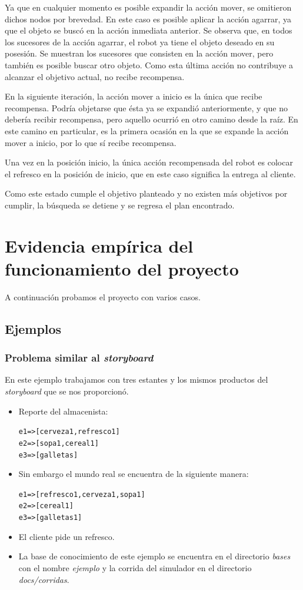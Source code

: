 \documentclass[11pt]{article}
\newcommand{\bt}{\begin{alltt}}
\newcommand{\et}{\end{alltt}}
\begin{document}
Ya que en cualquier momento es posible expandir la acción mover, se omitieron dichos nodos por brevedad. En este caso es posible aplicar la acción agarrar, ya que el objeto se buscó en la acción inmediata anterior. Se observa que, en todos los sucesores de la acción agarrar, el robot ya tiene el objeto deseado en su posesión. Se muestran los sucesores que consisten en la acción mover, pero también es posible buscar otro objeto. Como esta última acción no contribuye a alcanzar el objetivo actual, no recibe recompensa.

En la siguiente iteración, la acción mover a inicio es la única que recibe recompensa. Podría objetarse que ésta ya se expandió anteriormente, y que no debería recibir recompensa, pero aquello ocurrió en otro camino desde la raíz. En este camino en particular, es la primera ocasión en la que se expande la acción mover a inicio, por lo que sí recibe recompensa.

Una vez en la posición inicio, la única acción recompensada del robot es colocar el refresco en la posición de inicio, que en este caso significa la entrega al cliente.

Como este estado cumple el objetivo planteado y no existen más objetivos por cumplir, la búsqueda se detiene y se regresa el plan encontrado.

\section{Evidencia empírica del funcionamiento del proyecto}

A continuación probamos el proyecto con varios casos.

\subsection{Ejemplos}

\subsubsection{Problema similar al \emph{storyboard}}

En este ejemplo trabajamos con tres estantes y los mismos
productos del \emph{storyboard} que se nos proporcionó.

\begin{itemize}
\item Reporte del almacenista:
  \bt
  e1 => [cerveza1,refresco1]
  e2 => [sopa1,cereal1]
  e3 => [galletas]
  \et
\item Sin embargo el mundo real se encuentra de la siguiente manera:
  \bt
  e1 => [refresco1,cerveza1,sopa1]
  e2 => [cereal1]
  e3 => [galletas1]
  \et
\item El cliente pide un refresco.
\item La base de conocimiento de este ejemplo se encuentra
  en el directorio \emph{bases} con el nombre \emph{ejemplo}  y la corrida del simulador
  en el directorio \emph{docs/corridas}.
\end{itemize}
\end{document}
